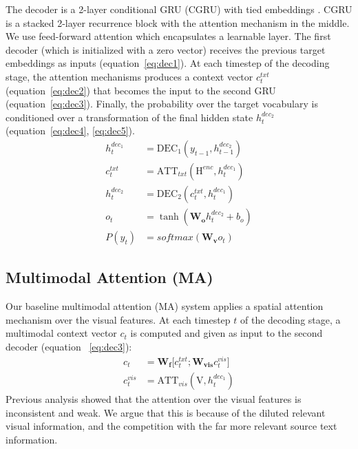 \documentclass[11pt,a4paper]{article}
\begin{document}
The decoder is a 2-layer conditional GRU (CGRU) \cite{nematus} with tied embeddings \cite{press2016using}.
CGRU is a stacked 2-layer recurrence block with the attention mechanism in the middle. We use feed-forward attention \cite{Bahdanau2014} which encapsulates a learnable layer. The first decoder (which is initialized with a zero vector) receives the previous target embeddings as inputs (equation~\ref{eq:dec1}). At each timestep of the decoding stage, the attention mechanisms produces a context vector $c^{txt}_{t}$ (equation~\ref{eq:dec2}) that becomes the input to the second GRU (equation~\ref{eq:dec3}). Finally, the probability over the target vocabulary is conditioned over a transformation of the final hidden state $h^{dec_{2}}_t$ (equation~\ref{eq:dec4}, \ref{eq:dec5}).
\begin{align}
  h^{dec_{1}}_{t} &= \mathrm{DEC}_{1}(y_{t-1}, h^{dec_{2}}_{t-1})\label{eq:dec1}\\
  c^{txt}_{t} &= \mathrm{ATT}_{txt}(\mathrm{H}^{enc}, h^{dec_{1}}_{t})\label{eq:dec2}\\
  h^{dec_{2}}_{t} &= \mathrm{DEC}_{2}(c^{txt}_{t}, h^{dec_{1}}_{t})\label{eq:dec3}\\
  o_t &= \tanh (\mathbf{W_{o}} h^{dec_{2}}_t + b_{o})\label{eq:dec4}\\
  P(y_t) &= softmax(\mathbf{W_{v}} o_t)\label{eq:dec5}
\end{align}

\subsection{Multimodal Attention (MA)}
Our baseline multimodal attention (MA) system \cite{caglayan2016multiatt} applies a spatial attention mechanism \cite{xu2015show} over the visual features.
At each timestep $t$ of the decoding stage, a multimodal context vector $c_t$ is computed and given as input to the second decoder (equation ~\ref{eq:dec3}):
\begin{align}
  c_t &= \mathbf{W_{f}}\big[c^{txt}_t; \mathbf{W_{vis}}c^{vis}_t\big]\\
  c^{vis}_{t} &= \mathrm{ATT}_{vis}(\mathrm{V}, h^{dec_{1}}_{t})\label{eq:dec6}
\end{align}
Previous analysis showed that the attention over the visual features is inconsistent and weak.
We argue that this is because of the diluted relevant visual information, and the competition with the far more relevant source text information.
\end{document}
